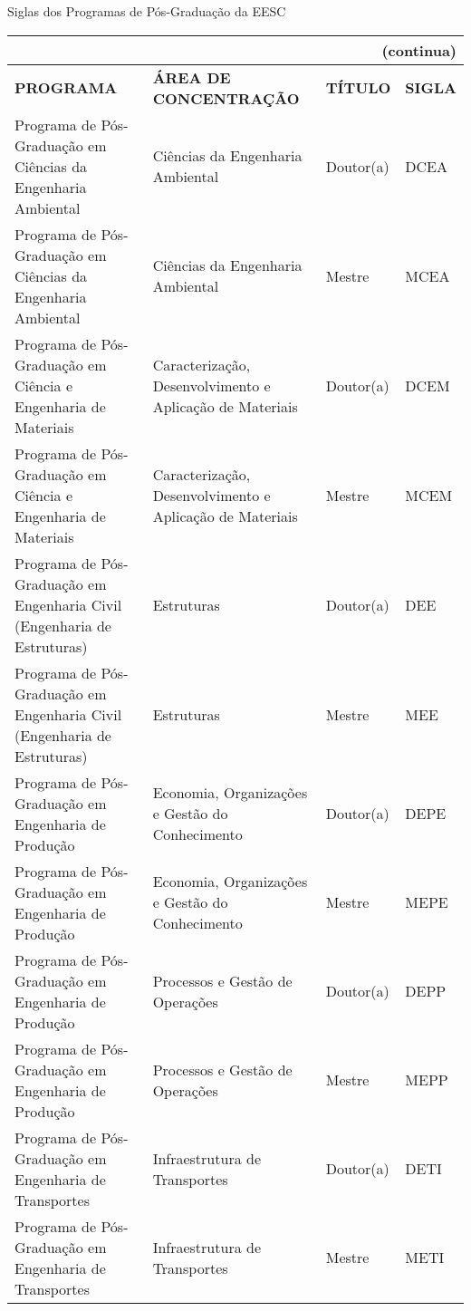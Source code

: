 \begin{apendicesenv}
\begin{quadro}[htb]
\ABNTEXfontereduzida
\caption[Siglas dos Programas de Pós-Graduação da EESC]{Siglas dos Programas de Pós-Graduação da EESC} 
\label{quadro-eesc}
\begin{tabular}{|p{6.0cm}|p{4.5cm}|p{2.0cm}|p{1.75cm}|}
\multicolumn{4}{r}{{(continua)}} \\ 
  \hline
   \textbf{PROGRAMA} & \textbf{ÁREA DE CONCENTRAÇÃO} & \textbf{TÍTULO} & \textbf{SIGLA}  \\
    \hline
Programa de Pós-Graduação em Ciências da Engenharia Ambiental & Ciências da Engenharia Ambiental & Doutor(a) & DCEA \\
Programa de Pós-Graduação em Ciências da Engenharia Ambiental & Ciências da Engenharia Ambiental & Mestre & MCEA \\
Programa de Pós-Graduação em Ciência e Engenharia de Materiais & Caracterização, Desenvolvimento e Aplicação de Materiais  & Doutor(a) & DCEM \\
Programa de Pós-Graduação em Ciência e Engenharia de Materiais & Caracterização, Desenvolvimento e Aplicação de Materiais & Mestre & MCEM \\
Programa de Pós-Graduação em Engenharia Civil (Engenharia de Estruturas) & Estruturas & Doutor(a) & DEE \\
Programa de Pós-Graduação em Engenharia Civil (Engenharia de Estruturas) & Estruturas & Mestre & MEE \\
Programa de Pós-Graduação em Engenharia de Produção & Economia, Organizações e Gestão do Conhecimento & Doutor(a) & DEPE \\
Programa de Pós-Graduação em Engenharia de Produção & Economia, Organizações e Gestão do Conhecimento & Mestre & MEPE \\
Programa de Pós-Graduação em Engenharia de Produção & Processos e Gestão de Operações & Doutor(a) & DEPP \\
Programa de Pós-Graduação em Engenharia de Produção & Processos e Gestão de Operações & Mestre & MEPP \\
Programa de Pós-Graduação em Engenharia de Transportes & Infraestrutura de Transportes & Doutor(a) & DETI \\
Programa de Pós-Graduação em Engenharia de Transportes & Infraestrutura de Transportes & Mestre & METI \\

\end{tabular}
\end{quadro}
\end{apendicesenv}
